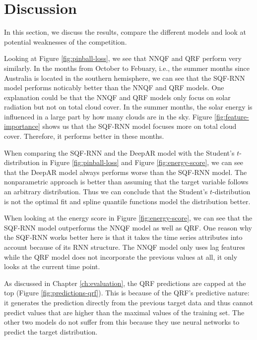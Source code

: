 \section{Discussion}
\label{sec:discussion}

In this section, we discuss the results, compare the different 
models and look at potential weaknesses of the competition. 

Looking at Figure \ref{fig:pinball-loss}, we see that NNQF and QRF perform very similarly. 
In the months from October to Febuary, i.e., the summer months since 
Australia is located in the southern hemisphere, we can see that 
the SQF-RNN model performs noticably better than the NNQF and QRF models. 
One explanation could be that the NNQF and QRF models only focus on solar 
radiation but not on total cloud cover.  
In the summer months, the solar energy is influenced in a large part by 
how many clouds are in the sky. Figure \ref{fig:feature-importance} shows us that 
the SQF-RNN model focuses more on total cloud cover. Therefore, 
it performs better in these months. 

When comparing the SQF-RNN and the DeepAR model with 
the Student's \(t\)-distribution in Figure \ref{fig:pinball-loss} and 
Figure \ref{fig:energy-score}, we can see that the DeepAR model 
always performs worse than the SQF-RNN model. 
The nonparametric approach is better than assuming 
that the target variable follows an arbitrary distribution. 
Thus we can conclude that the Student's \(t\)-distribution is not the optimal fit 
and spline quantile functions model the distribution better. 

When looking at the energy score in Figure \ref{fig:energy-score}, 
we can see that the SQF-RNN model outperforms the NNQF model as well as QRF.
One reason why the SQF-RNN works better here is that it takes 
the time series attributes into account because of its RNN structure. 
The NNQF model only uses lag features while the QRF model does not incorporate 
the previous values at all, it only looks at the current time point.

As discussed in Chapter \ref{ch:evaluation}, 
the QRF predictions are capped 
at the top (Figure \ref{fig:predictions-qrf}). 
This is because of the QRF's predictive nature: it generates 
the prediction directly from the previous target data 
and thus cannot predict values 
that are higher than the maximal values of the training set. 
The other two models do not suffer from this because they use 
neural networks to predict the target distribution.

